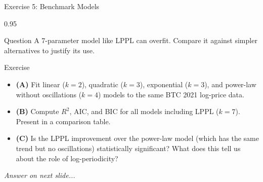 \documentclass[9pt, aspectratio=169, t]{beamer}
\begin{document}
\begin{frame}{Exercise 5: Benchmark Models}
    \begin{cminipage}{0.95\textwidth}
    \begin{alertblock}{Question}
        A 7-parameter model like LPPL can overfit. Compare it against simpler alternatives to justify its use.
    \end{alertblock}

    \vspace{0.2cm}

    \begin{block}{Exercise}
        \begin{itemize}\setlength{\itemsep}{3pt}
            \item \textcolor{MainBlue}{\textbf{(A)}} Fit linear ($k=2$), quadratic ($k=3$), exponential ($k=3$), and power-law without oscillations ($k=4$) models to the same BTC 2021 log-price data.
            \item \textcolor{MainBlue}{\textbf{(B)}} Compute $R^2$, AIC, and BIC for all models including LPPL ($k=7$). Present in a comparison table.
            \item \textcolor{MainBlue}{\textbf{(C)}} Is the LPPL improvement over the power-law model (which has the same trend but no oscillations) statistically significant? What does this tell us about the role of log-periodicity?
        \end{itemize}
    \end{block}

    \vspace{0.15cm}

    \begin{center}
        \textit{Answer on next slide...}
    \end{center}
    \end{cminipage}
\end{frame}
\end{document}
